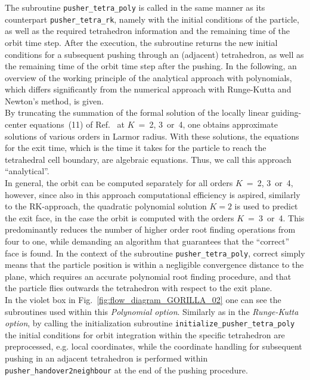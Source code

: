 \documentclass{TheMartianReport}
\begin{document}
The subroutine \texttt{pusher\_tetra\_poly} is called in the same manner as its counterpart \texttt{pusher\_tetra\_rk}, namely with the initial conditions of the particle,  as well as the required tetrahedron information and the remaining time of the orbit time step.  After the execution, the subroutine returns the new initial conditions for a subsequent pushing through an (adjacent) tetrahedron, as well as the remaining time of the orbit time step after the pushing. In the following, an overview of the working principle of the analytical approach with polynomials, which differs significantly from the numerical approach with Runge-Kutta and Newton's method, is given. \\
%
By truncating the summation of the formal solution of the locally linear guiding-center equations~(11) of Ref.~ at $K$~=~2, 3~or~4, one obtains
approximate solutions of various orders in Larmor radius. With these solutions, the equations for the exit time, which is the time it takes for the particle to reach the tetrahedral cell boundary, are algebraic equations. Thus, we call this approach ``analytical''.\\
%
In general, the orbit can be computed separately for all orders $K$~=~2, 3~or~4, however, since also in this approach computational efficiency is aspired, similarly to the RK-approach, the quadratic polynomial solution $K = 2$ is used to predict the exit face, in the case the orbit is computed with the orders $K$~=~3~or~4. This predominantly reduces the number of higher order root finding operations from four to one, while demanding an algorithm that guarantees that the ``correct'' face is found. In the context of the subroutine \texttt{pusher\_tetra\_poly}, correct simply means that the particle position is within a negligible convergence distance to the plane, which requires an accurate polynomial root finding procedure, and that the particle flies outwards the tetrahedron with respect to the exit plane.\\
%
In the violet box in Fig.~\ref{fig:flow_diagram_GORILLA_02} one can see the subroutines used within this \textit{Polynomial option}. Similarly as in the \textit{Runge-Kutta option}, by calling the initialization subroutine \texttt{initialize\_pusher\_tetra\_poly} the initial conditions for orbit integration within the specific tetrahedron are preprocessed, e.g. local coordinates, while the coordinate handling for subsequent pushing in an adjacent tetrahedron is performed within \texttt{pusher\_handover2neighbour} at the end of the pushing procedure.\\
\end{document}
